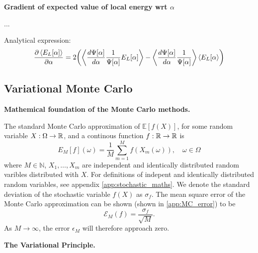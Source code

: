 \textbf{Gradient of expected value of local energy wrt $\alpha$}

...

Analytical expression: 
\begin{equation}\label{eq:grad_expval_E_L}
    \frac{\partial \expval{E_L[\mathbf{\alpha}]}}{\partial\mathbf{\alpha}} = 2\qty(\expval{\frac{d\Psi[\mathbf{\alpha}]}{d\mathbf{\alpha}}\frac{1}{\Psi[\mathbf{\alpha}]}E_L[\mathbf{\alpha}]} - \expval{\frac{d\Psi[\mathbf{\alpha}]}{d\mathbf{\alpha}}\frac{1}{\Psi[\mathbf{\alpha}]}}\expval{E_L[\mathbf{\alpha}})
\end{equation}


\subsection*{Variational Monte Carlo}

\textbf{Mathemical foundation of the Monte Carlo methods.}

The standard Monte Carlo approximation of $\mathbb{E}[f(X)]$, for some random variable $X:\Omega\to\mathbb{R}$, and a continous function $f:\mathbb{R}\to\mathbb{R}$ is
\begin{equation}
    E_M[f](\omega)= \frac{1}{M}\sum_{m=1}^Mf(X_m(\omega)), \quad \omega\in\Omega
\end{equation}
where $M\in\mathbb{N}$, $X_1, \dots, X_m$ are independent and identically distributed random varibles distributed with $X$. For definitions of indepent and identically distributed random variables, see appendix \ref{app:stochastic_maths}. We denote the standard deviation of the stochastic variable $f(X)$ as $\sigma_f$. The mean square error of the Monte Carlo approximation can be shown (shown in \ref{app:MC_error}) to be 
\begin{equation}
    \mathcal{E}_M(f) = \frac{\sigma_f}{\sqrt{M}}. 
\end{equation}
As $M\to\infty$, the error $\epsilon_M$ will therefore approach zero.

\textbf{The Variational Principle.}

